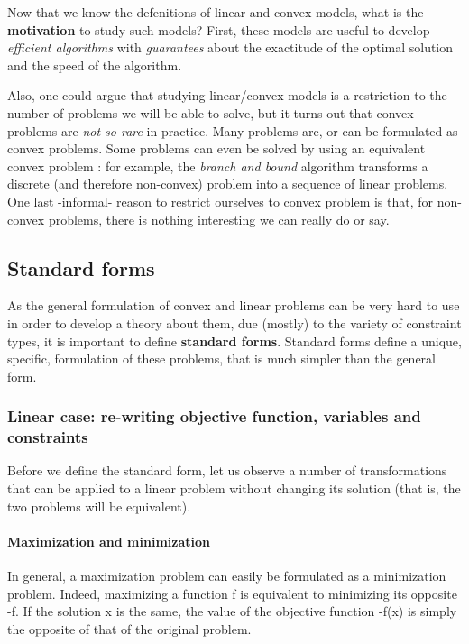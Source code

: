 \documentclass[a4paper]{article}
\begin{document}
Now that we know the defenitions of linear and convex models, what is the \textbf{motivation} to study such models? First, these models are useful to develop \textit{efficient algorithms} with \textit{guarantees} about the exactitude of the optimal solution and the speed of the algorithm.

Also, one could argue that studying linear/convex models is a restriction to the number of problems we will be able to solve, but it turns out that convex problems are \textit{not so rare} in practice. Many problems are, or can be formulated as convex problems. Some problems can even be solved by using an equivalent convex problem : for example, the \textit{branch and bound} algorithm transforms a discrete (and therefore non-convex) problem into a sequence of linear problems. One last -informal- reason to restrict ourselves to convex problem is that, for non-convex problems, there is nothing interesting we can really do or say.


\subsection{Standard forms}
As the general formulation of convex and linear problems can be very hard to use in order to develop a theory about them, due (mostly) to the variety of constraint types, it is important to define \textbf{standard forms}. Standard forms define a unique, specific, formulation of these problems, that is much simpler than the general form.

\subsubsection{Linear case: re-writing objective function, variables and constraints}
Before we define the standard form, let us observe a number of transformations that can be applied to a linear problem without changing its solution (that is, the two problems will be equivalent).

\paragraph{Maximization and minimization}
In general, a maximization problem can easily be formulated as a minimization problem. Indeed, maximizing a function \textsf{f} is equivalent to minimizing its opposite \textsf{-f}. If the solution \textsf{x} is the same, the value of the objective function \textsf{-f(x)} is simply the opposite of that of the original problem.
\end{document}
